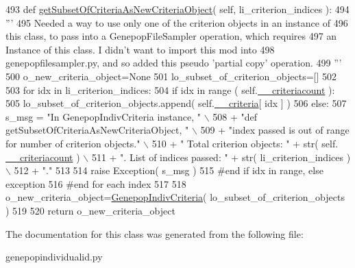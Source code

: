 \begin{DoxyCode}
493     \textcolor{keyword}{def }\hyperlink{classnegui_1_1genepopindividualid_1_1GenepopIndivCriteria_a30cfe91fa9b4cb481ecf5cab3332ac56}{getSubsetOfCriteriaAsNewCriteriaObject}( self, 
      li\_criterion\_indices ):
494         \textcolor{stringliteral}{'''}
495 \textcolor{stringliteral}{        Needed a way to use only one of the criterion objects in an instance of}
496 \textcolor{stringliteral}{        this class, to pass into a GenepopFileSampler operation, which requires }
497 \textcolor{stringliteral}{        an Instance of this class.  I didn't want to import this mod into }
498 \textcolor{stringliteral}{        genepopfilesampler.py, and so added this pseudo 'partial copy' operation.}
499 \textcolor{stringliteral}{        '''}
500         o\_new\_criteria\_object=\textcolor{keywordtype}{None}
501         lo\_subset\_of\_criterion\_objects=[]
502 
503         \textcolor{keywordflow}{for} idx \textcolor{keywordflow}{in} li\_criterion\_indices:
504             \textcolor{keywordflow}{if} idx \textcolor{keywordflow}{in} range ( self.\hyperlink{classnegui_1_1genepopindividualid_1_1GenepopIndivCriteria_a3970df1944e4fa0b8b463c93546799e7}{\_\_criteriacount} ):
505                 lo\_subset\_of\_criterion\_objects.append( self.\hyperlink{classnegui_1_1genepopindividualid_1_1GenepopIndivCriteria_a1dc62d416ebd5e5edeb4fd3e494e3b58}{\_\_criteria}[ idx ] )
506             \textcolor{keywordflow}{else}:
507                 s\_msg = \textcolor{stringliteral}{"In GenepopIndivCriteria instance, "} \(\backslash\)
508                         + \textcolor{stringliteral}{"def getSubsetOfCriteriaAsNewCriteriaObject, "} \(\backslash\)
509                         + \textcolor{stringliteral}{"index passed is out of range for number of criterion objects."} \(\backslash\)
510                         + \textcolor{stringliteral}{"  Total criterion objects: "} + str( self.
      \hyperlink{classnegui_1_1genepopindividualid_1_1GenepopIndivCriteria_a3970df1944e4fa0b8b463c93546799e7}{\_\_criteriacount} ) \(\backslash\)
511                         + \textcolor{stringliteral}{".  List of indices passed: "} + str( li\_criterion\_indices ) \(\backslash\)
512                         + \textcolor{stringliteral}{"."}
513 
514                 \textcolor{keywordflow}{raise} Exception( s\_msg )
515             \textcolor{comment}{#end if idx in range, else exception}
516         \textcolor{comment}{#end for each index}
517 
518         o\_new\_criteria\_object=\hyperlink{classnegui_1_1genepopindividualid_1_1GenepopIndivCriteria}{GenepopIndivCriteria}( lo\_subset\_of\_criterion\_objects )
519         
520         \textcolor{keywordflow}{return} o\_new\_criteria\_object
\end{DoxyCode}


The documentation for this class was generated from the following file\+:\begin{DoxyCompactItemize}
\item 
genepopindividualid.\+py\end{DoxyCompactItemize}
